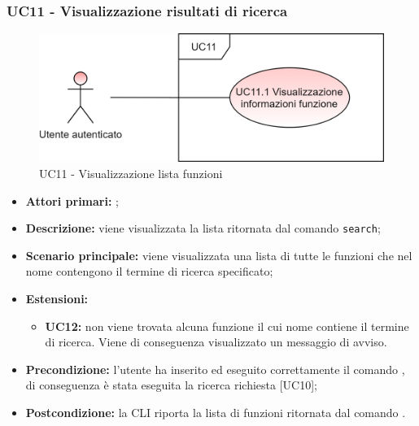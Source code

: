 \subsubsection{UC11 - Visualizzazione risultati di ricerca}
\begin{figure}[H]
	\centering
	\includegraphics[scale=\ucs]{./res/img/UC11.png}
	\caption {UC11 - Visualizzazione lista funzioni}
\end{figure}
\begin{itemize}
	\item \textbf{Attori primari:} \ua{};
	\item \textbf{Descrizione:} viene visualizzata la lista ritornata dal comando \texttt{search};
	\item \textbf{Scenario principale:} viene visualizzata una lista di tutte le funzioni che nel nome contengono il termine di ricerca specificato;
	\item \textbf{Estensioni:} 
	\begin{itemize}
		\item \textbf{UC12:} non viene trovata alcuna funzione il cui nome contiene il termine di ricerca. Viene di conseguenza visualizzato un messaggio di avviso.
	\end{itemize}
	\item \textbf{Precondizione:} l’utente ha inserito ed eseguito correttamente il comando \search{}, di conseguenza è stata eseguita la ricerca richiesta [UC10];
	\item \textbf{Postcondizione:} la CLI riporta la lista di funzioni ritornata dal comando \search{}.
\end{itemize}
